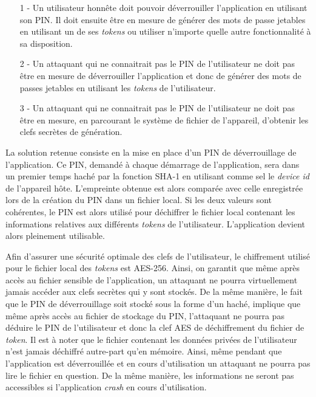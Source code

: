 \begin{itemize}
  \item[1 -] Un utilisateur honnête doit pouvoir déverrouiller l'application en utilisant
  son PIN. Il doit ensuite être en mesure de générer des mots de passe jetables en utilisant
  un de ses \emph{tokens} ou utiliser n'importe quelle autre fonctionnalité à sa
  disposition.
  \item[2 -] Un attaquant qui ne connaitrait pas le PIN de l'utilisateur ne doit pas être en
  mesure de déverrouiller l'application et donc de générer des mots de passes jetables en
  utilisant les \emph{tokens} de l'utilisateur.
  \item[3 -] Un attaquant qui ne connaitrait pas le PIN de l'utilisateur ne doit pas être en
  mesure, en parcourant le système de fichier de l'appareil, d'obtenir les clefs secrètes
  de génération.
\end{itemize}

La solution retenue consiste en la mise en place d'un PIN de déverrouillage de l'application.
Ce PIN, demandé à chaque démarrage de l'application, sera dans un premier temps haché par la
fonction SHA-1 en utilisant comme sel le \emph{device id} de l'appareil hôte. L'empreinte
obtenue est alors comparée avec celle enregistrée lors de la création du PIN dans un fichier
local. Si les deux valeurs sont cohérentes, le PIN est alors utilisé pour déchiffrer le
fichier local contenant les informations relatives aux différents \emph{tokens} de
l'utilisateur. L'application devient alors pleinement utilisable.

Afin d'assurer une sécurité optimale des clefs de l'utilisateur, le chiffrement utilisé pour
le fichier local des \emph{tokens} est AES-256. Ainsi, on garantit que même après accès au
fichier sensible de l'application, un attaquant ne pourra virtuellement jamais accéder aux
clefs secrètes qui y sont stockés. De la même manière, le fait que le PIN de déverrouillage
soit stocké sous la forme d'un haché, implique que même après accès au fichier de stockage du
PIN, l'attaquant ne pourra pas déduire le PIN de l'utilisateur et donc la clef AES de déchiffrement du fichier de \emph{token}. Il est à noter que le fichier contenant les données
privées de l'utilisateur n'est jamais déchiffré autre-part qu'en mémoire. Ainsi, même pendant
que l'application est déverrouillée et en cours d'utilisation un attaquant ne pourra pas lire
le fichier en question. De la même manière, les informations ne seront pas accessibles si
l'application \emph{crash} en cours d'utilisation.




